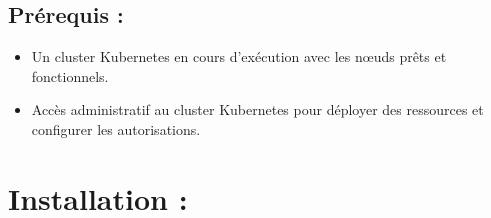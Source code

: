 \subsection*{Prérequis :}

\begin{itemize}
\item Un cluster Kubernetes en cours d’exécution avec les nœuds prêts et fonctionnels.
\item Accès administratif au cluster Kubernetes pour déployer des ressources et configurer les autorisations.
\end{itemize}

\section*{Installation :}

